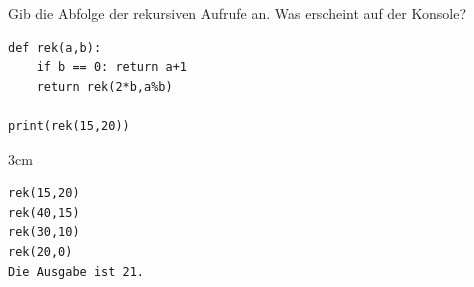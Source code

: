 \question[3]
Gib die Abfolge der rekursiven Aufrufe an. Was erscheint auf der Konsole?
\begin{lstlisting}
def rek(a,b):
    if b == 0: return a+1
    return rek(2*b,a%b)

print(rek(15,20))
\end{lstlisting}
\begin{solutionbox}{3cm}
\begin{lstlisting}
rek(15,20)
rek(40,15)
rek(30,10)
rek(20,0)
Die Ausgabe ist 21.
\end{lstlisting}
\end{solutionbox}
